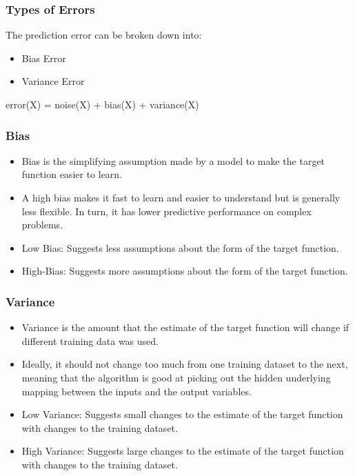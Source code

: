 \begin{frame}[fragile]\frametitle{Types of Errors}
The prediction error can be broken down into:
\begin{itemize}
\item Bias Error
\item Variance Error
\end{itemize}
error(X) = noise(X) + bias(X) + variance(X)
\end{frame}

\begin{frame}[fragile]\frametitle{Bias}

\begin{itemize}
\item Bias is the simplifying assumption made by a model to make the target function easier to learn.
\item A high bias makes it fast to learn and easier to understand but is generally less flexible.  In turn, it has lower predictive performance on complex problems.
\item 
    Low Bias: Suggests less assumptions about the form of the target function.
    \item
    High-Bias: Suggests more assumptions about the form of the target function.

\end{itemize}
\end{frame}

\begin{frame}[fragile]\frametitle{Variance }

\begin{itemize}
\item Variance is the amount that the estimate of the target function will change if different training data was used.
\item  Ideally, it should not change too much from one training dataset to the next, meaning that the algorithm is good at picking out the hidden underlying mapping between the inputs and the output variables.
\item 
    Low Variance: Suggests small changes to the estimate of the target function with changes to the training dataset.
    \item 
    High Variance: Suggests large changes to the estimate of the target function with changes to the training dataset.

\end{itemize}
\end{frame}


